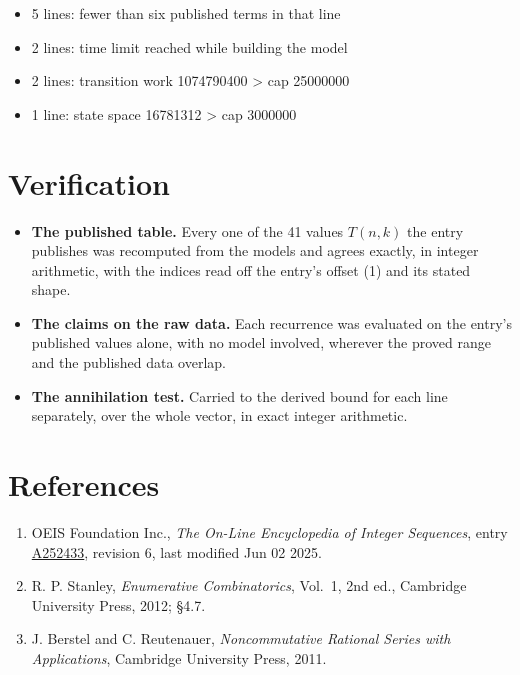 \documentclass[11pt]{article}
\theoremstyle{definition}
\begin{document}
\begin{itemize}

\item 5 lines: fewer than six published terms in that line

\item 2 lines: time limit reached while building the model

\item 2 lines: transition work 1074790400 > cap 25000000

\item 1 line: state space 16781312 > cap 3000000

\end{itemize}

\section{Verification}

\begin{itemize}

\item {\bfseries The published table.} Every one of the 41 values $T(n,k)$ the entry publishes was recomputed from the models and agrees exactly, in integer arithmetic, with the indices read off the entry's offset (1) and its stated shape.

\item {\bfseries The claims on the raw data.} Each recurrence was evaluated on the entry's published values alone, with no model involved, wherever the proved range and the published data overlap.

\item {\bfseries The annihilation test.} Carried to the derived bound for each line separately, over the whole vector, in exact integer arithmetic.

\end{itemize}

\section{References}

\begin{enumerate}

\item OEIS Foundation Inc., \emph{The On-Line Encyclopedia of Integer Sequences}, entry \href{https://oeis.org/A252433}{A252433}, revision 6, last modified Jun 02 2025.

\item R. P. Stanley, \emph{Enumerative Combinatorics}, Vol.~1, 2nd ed., Cambridge University Press, 2012; \S4.7.

\item J. Berstel and C. Reutenauer, \emph{Noncommutative Rational Series with Applications}, Cambridge University Press, 2011.

\end{enumerate}
\end{document}
